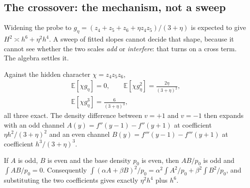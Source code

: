 
\subsection{The crossover: the mechanism, not a sweep}
\label{sec:crossover}

Widening the probe to $g_{\eta}=(z_{4}+z_{5}+z_{6}+\eta z_{4}z_{5})/(3+\eta)$ is expected
to give $H^{2}\asymp h^{6}+\eta^{2}h^{4}$. A sweep of fitted slopes cannot decide that
shape, because it cannot see whether the two scales \emph{add} or \emph{interfere}: that
turns on a cross term. The algebra settles it.

Against the hidden character $\chi=z_{4}z_{5}z_{6}$,
\begin{gather*}
\mathbb{E}[\chi g_{\eta}]=0,\qquad
\mathbb{E}[\chi g_{\eta}^{2}]=\frac{2\eta}{(3+\eta)^{2}},\\
\mathbb{E}[\chi g_{\eta}^{3}]=\frac{6}{(3+\eta)^{3}},
\end{gather*}
all three exact. The density difference between $v=+1$ and $v=-1$ then expands with an odd
channel $A(y)=f''(y-1)-f''(y+1)$ at coefficient $\eta h^{2}/(3+\eta)^{2}$ and an even
channel $B(y)=f'''(y-1)-f'''(y+1)$ at coefficient $h^{3}/(3+\eta)^{3}$.

\begin{theorem}
\label{thm:parity}
If $A$ is odd, $B$ is even and the base density $p_{0}$ is even, then $AB/p_{0}$ is odd and
$\int AB/p_{0}=0$. Consequently
$\int(\alpha A+\beta B)^{2}/p_{0}=\alpha^{2}\int A^{2}/p_{0}+\beta^{2}\int B^{2}/p_{0}$,
and substituting the two coefficients gives exactly $\eta^{2}h^{4}$ plus $h^{6}$.
\end{theorem}

